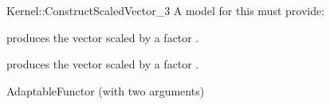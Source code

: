 \begin{ccRefFunctionObjectConcept}{Kernel::ConstructScaledVector_3}
A model for this must provide:


            {produces the vector  scaled by a factor .}

            {produces the vector  scaled by a factor .}


\ccRefines
AdaptableFunctor (with two arguments)

\ccSeeAlso
{}\\

\end{ccRefFunctionObjectConcept}
